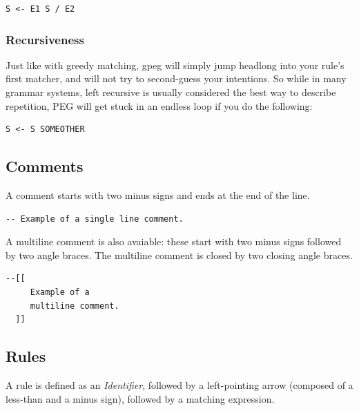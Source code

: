 \begin{myquote}
\begin{verbatim}
S <- E1 S / E2
\end{verbatim}
\end{myquote}

\subsubsection{Recursiveness}

Just like with greedy matching, gpeg will simply jump headlong
into your rule's first matcher, and will not try to second-guess your
intentions. So while in many grammar systems, left recursive is
usually considered the best way to describe
repetition, PEG will get stuck in an endless loop if you do the following:

\begin{myquote}
\begin{verbatim}
S <- S SOMEOTHER
\end{verbatim}
\end{myquote}

\subsection{Comments}

A comment starts with two minus signs and ends at the end of the line.

\begin{myquote}
\begin{verbatim}
-- Example of a single line comment.
\end{verbatim}
\end{myquote}

A multiline comment is also avaiable: these start with two minus signs
followed by two angle braces. The multiline comment is closed by two
closing angle braces.

\begin{myquote}
\begin{verbatim}
--[[
     Example of a
     multiline comment.
  ]]
\end{verbatim}
\end{myquote}

\subsection{Rules}

A rule is defined as an \textit{Identifier}, followed by a
left-pointing arrow (composed of a less-than and a minus sign),
followed by a matching expression.

